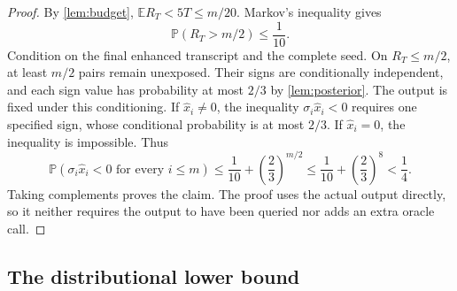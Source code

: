 \documentclass[11pt]{article}
\newcommand{\E}{\mathbb{E}}
\newcommand{\Prob}{\mathbb{P}}
\theoremstyle{definition}
\theoremstyle{remark}
\begin{document}
\begin{proof}
By \cref{lem:budget},
$\E R_T<5T\le m/20$.  Markov's inequality gives
\[
 \Prob(R_T>m/2)\le\frac1{10}.
\]
Condition on the final enhanced transcript and the complete seed.  On
$R_T\le m/2$, at least $m/2$ pairs remain unexposed.  Their signs are
conditionally independent, and each sign value has probability at most
$2/3$ by \cref{lem:posterior}.  The output is fixed under this
conditioning.  If $\widehat x_i\ne0$, the inequality
$\sigma_i\widehat x_i<0$ requires one specified sign, whose conditional
probability is at most $2/3$.  If $\widehat x_i=0$, the inequality is
impossible.  Thus
\[
 \Prob(\sigma_i\widehat x_i<0\text{ for every }i\le m)
 \le\frac1{10}+\left(\frac23\right)^{m/2}
 \le\frac1{10}+\left(\frac23\right)^8
 <\frac14.
\]
Taking complements proves the claim.  The proof uses the actual output
directly, so it neither requires the output to have been queried nor
adds an extra oracle call.
\end{proof}

\subsection{The distributional lower bound}
\end{document}
